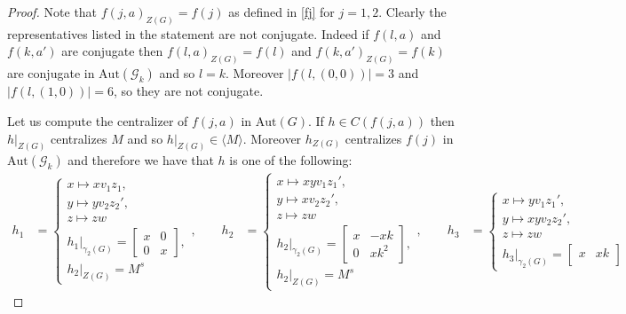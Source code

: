 \documentclass[a4paper, english, 9pt]{amsart}
\theoremstyle{plain}
\theoremstyle{definition}
\def\aut#1{\mathrm{Aut}(#1)}
\begin{document}
\begin{proof}
Note that $f(j,a)_{Z(G)}=f(j)$ as defined in \eqref{fj} for $j=1,2$. Clearly the representatives listed in the statement are not conjugate. Indeed if $f(l,a)$ and $f(k,a')$ are conjugate then $f(l,a)_{Z(G)}=f(l)$ and $f(k,a')_{Z(G)}=f(k)$ are conjugate in $\aut{\mathcal{G}_k}$ and so $l=k$. Moreover $|f(l,(0,0))|=3$ and $|f(l,(1,0))|=6$, so they are not conjugate.

Let us compute the centralizer of $f(j,a)$ in $\aut{G}$. If $h\in C(f(j,a))$ then $h|_{Z(G)}$ centralizes $M$ and so $h|_{Z(G)}\in \langle M\rangle$. Moreover $h_{Z(G)}$ centralizes $f(j)$ in $\aut{\mathcal{G}_k}$ and therefore we have that $h$ is one of the following:
\begin{align*}\label{aut of G_k x Klein}
        h_1&=\begin{cases}
          x\mapsto xv_1 z_1,\\
                  y\mapsto y v_2 z_2',\\
                  z\mapsto z w\\   h_1|_{\gamma_2(G)}=\begin{bmatrix}
                      x & 0\\
                      0 & x
                  \end{bmatrix},\\
                  h_2|_{Z(G)}=M^s
       \end{cases},\qquad
       h_2&=\begin{cases}
          x\mapsto xy v_1 z_1',\\
                  y\mapsto x v_2 z_2',\\
                  z\mapsto z w\\   h_2|_{\gamma_2(G)}=\begin{bmatrix}
                      x & -xk\\
                      0 & xk^2
                  \end{bmatrix},\\
                  h_2|_{Z(G)}=M^s
       \end{cases},\qquad
        h_3&=\begin{cases}
          x\mapsto y v_1 z_1',\\
                  y\mapsto xy v_2 z_2',\\
                  z\mapsto z w\\   h_3|_{\gamma_2(G)}=\begin{bmatrix}
                      x & xk\\

\end{bmatrix}
\end{cases}
\end{align*}
\end{proof}
\end{document}
